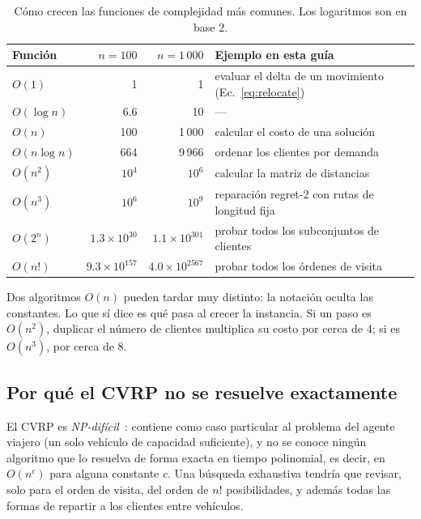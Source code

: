 \documentclass[11pt,a4paper]{article}
\begin{document}
\begin{table}[H]
\centering
\caption{Cómo crecen las funciones de complejidad más comunes. Los logaritmos son en base 2.}
\label{tab:crecimiento}
\small
\begin{tabular}{@{}lrrl@{}}
\toprule
Función & $n=100$ & $n=1\,000$ & Ejemplo en esta guía \\
\midrule
$O(1)$        & 1 & 1 & evaluar el delta de un movimiento (Ec.~\ref{eq:relocate}) \\
$O(\log n)$   & 6.6 & 10 & --- \\
$O(n)$        & 100 & 1\,000 & calcular el costo de una solución \\
$O(n\log n)$  & 664 & 9\,966 & ordenar los clientes por demanda \\
$O(n^2)$      & $10^4$ & $10^6$ & calcular la matriz de distancias \\
$O(n^3)$      & $10^6$ & $10^9$ & reparación regret-2 con rutas de longitud fija \\
$O(2^n)$      & $1.3\times10^{30}$ & $1.1\times10^{301}$ & probar todos los subconjuntos de clientes \\
$O(n!)$       & $9.3\times10^{157}$ & $4.0\times10^{2567}$ & probar todos los órdenes de visita \\
\bottomrule
\end{tabular}
\end{table}

\begin{ideaclave}
Dos algoritmos $O(n)$ pueden tardar muy distinto: la notación oculta las constantes. Lo que sí dice
es qué pasa al crecer la instancia. Si un paso es $O(n^2)$, duplicar el número de clientes
multiplica su costo por cerca de 4; si es $O(n^3)$, por cerca de 8.
\end{ideaclave}

\subsection{Por qué el CVRP no se resuelve exactamente}

El CVRP es \emph{NP-difícil}~\cite{lenstra1981}: contiene como caso particular al problema del
agente viajero (un solo vehículo de capacidad suficiente), y no se conoce ningún algoritmo que lo
resuelva de forma exacta en tiempo polinomial, es decir, en $O(n^c)$ para alguna constante $c$. Una
búsqueda exhaustiva tendría que revisar, solo para el orden de visita, del orden de $n!$
posibilidades, y además todas las formas de repartir a los clientes entre vehículos.
\end{document}
